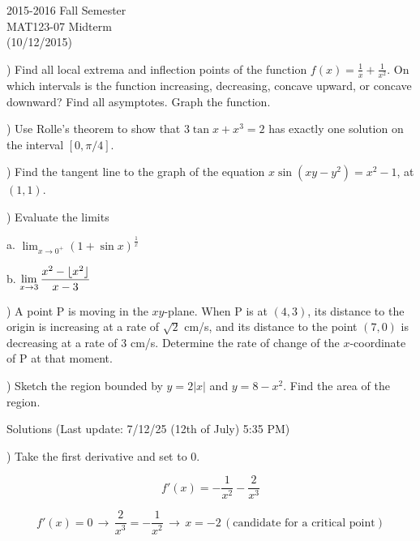 \documentclass{article}
\DeclarePairedDelimiter\floor{\lfloor}{\rfloor}
\begin{document}
\large

\begin{center}
2015-2016 Fall Semester\\MAT123-07 Midterm\\(10/12/2015)
\end{center}

) Find all local extrema and inflection points of the function $f(x) = \frac{1}{x} + \frac{1}{x^2}$. On which intervals is the function increasing, decreasing, concave upward, or concave downward? Find all asymptotes. Graph the function.


\hfill

) Use Rolle's theorem to show that $3\tan x + x^3 = 2$ has exactly one solution on the interval $[0,\pi/4]$.

\hfill

) Find the tangent line to the graph of the equation $x \sin(xy-y^2) = x^2-1$, at $(1,1)$.

\hfill

) Evaluate the limits

a. $\displaystyle \lim_{x\to 0^+} (1+\sin x)^{\frac{1}{x}}$

b. $\displaystyle \lim_{x\to 3} \frac{x^2-\floor{x^2}}{x-3}$

\hfill

) A point P is moving in the $xy$-plane. When P is at $(4, 3)$, its distance to the origin is increasing at a rate of $\sqrt{2}$ cm/s, and its distance to the point $(7, 0)$ is decreasing at a rate of 3 cm/s. Determine the rate of change of the $x$-coordinate of P at that moment.

\hfill

) Sketch the region bounded by $y=2|x|$ and $y=8-x^2$. Find the area of the region.

\newpage

\begin{center}
Solutions (Last update: 7/12/25 (12th of July) 5:35 PM)
\end{center}

) Take the first derivative and set to 0.

\begin{equation*}f'(x) = -\frac{1}{x^2} - \frac{2}{x^3}\end{equation*}

\begin{equation*}f'(x) = 0\,\rightarrow\,\frac{2}{x^3} = -\frac{1}{x^2}\,\rightarrow\,x = -2 \, (\text{candidate for a critical point})\end{equation*}
\end{document}
